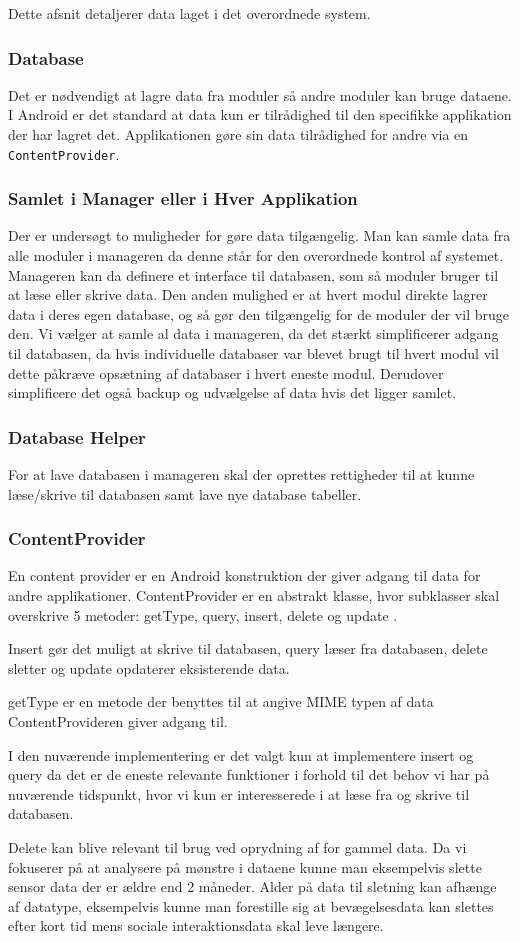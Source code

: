 Dette afsnit detaljerer data laget i det overordnede system. 

\subsubsection{Database}
Det er nødvendigt at lagre data fra moduler så andre moduler kan bruge dataene.
I Android er det standard at data kun er tilrådighed til den specifikke applikation der har lagret det.
Applikationen gøre sin data tilrådighed for andre via en \texttt{ContentProvider}.

\subsubsection{Samlet i Manager eller i Hver Applikation}
Der er undersøgt to muligheder for gøre data tilgængelig.
Man kan samle data fra alle moduler i manageren da denne står for den overordnede kontrol af systemet. 
Manageren kan da definere et interface til databasen, som så moduler bruger til at læse eller skrive data. 
Den anden mulighed er at hvert modul direkte lagrer data i deres egen database, og så gør den tilgængelig for de moduler der vil bruge den.
Vi vælger at samle al data i manageren, da det stærkt simplificerer adgang til databasen, da hvis individuelle databaser var blevet brugt til hvert modul vil dette påkræve opsætning af databaser i hvert eneste modul.
Derudover simplificere det også backup og udvælgelse af data hvis det ligger samlet.

\subsubsection{Database Helper}
For at lave databasen i manageren skal der oprettes rettigheder til at kunne læse/skrive til databasen samt lave nye database tabeller.

\subsubsection{ContentProvider}
En content provider er en Android konstruktion der giver adgang til data for andre applikationer.
ContentProvider er en abstrakt klasse, hvor subklasser skal overskrive 5 metoder:  getType, query, insert, delete og update \citep{contentprovider}.

Insert gør det muligt at skrive til databasen, query læser fra databasen, delete sletter og update opdaterer eksisterende data.

getType er en metode der benyttes til at angive MIME typen af data ContentProvideren giver adgang til.

I den nuværende implementering er det valgt kun at implementere insert og query da det er de eneste relevante funktioner i forhold til det behov vi har på nuværende tidspunkt, hvor vi kun er interesserede i at læse fra og skrive til databasen.

Delete kan blive relevant til brug ved oprydning af for gammel data. Da vi fokuserer på at analysere på mønstre i dataene kunne man eksempelvis slette sensor data der er ældre end 2 måneder. 
Alder på data til sletning kan afhænge af datatype, eksempelvis kunne man forestille sig at bevægelsesdata kan slettes efter kort tid mens sociale interaktionsdata skal leve længere.